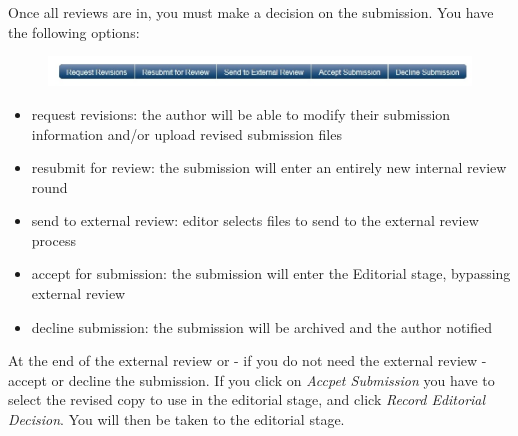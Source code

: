 Once all reviews are in, you must make a decision on the submission. You have the following options: 
\begin{figure}[h] \centering
\includegraphics[width=1\textwidth]{./img/internalReview-2.jpg} 
\end{figure}
\begin{itemize}[noitemsep]
\item request revisions: the author will be able to modify their submission information and/or upload revised submission files
\item resubmit for review: the submission will enter an entirely new internal review round
\item send to external review: editor selects files to send to the external review process
\item accept for submission: the submission will enter the Editorial stage, bypassing external review
\item decline submission: the submission will be archived and the author notified
\end{itemize}

At the end of the external review or - if you do not need the external review - accept or decline the submission. If you click on \textit{Accpet Submission} you have to select the revised copy to use in the editorial stage, and click \textit{Record Editorial Decision}. You will then be taken to the editorial stage.




